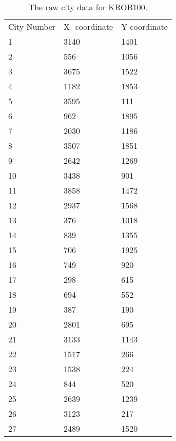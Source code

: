 \begin{longtable}[c]{ p{} p{} p{} } 
		\caption{The raw city data for KROB100.} \\   
	\label{longtable:KROB100Data}
	City Number & X- coordinate & Y-coordinate \\
	1           & 3140          & 1401         \\
	2           & 556           & 1056         \\
	3           & 3675          & 1522         \\
	4           & 1182          & 1853         \\
	5           & 3595          & 111          \\
	6           & 962           & 1895         \\
	7           & 2030          & 1186         \\
	8           & 3507          & 1851         \\
	9           & 2642          & 1269         \\
	10          & 3438          & 901          \\
	11          & 3858          & 1472         \\
	12          & 2937          & 1568         \\
	13          & 376           & 1018         \\
	14          & 839           & 1355         \\
	15          & 706           & 1925         \\
	16          & 749           & 920          \\
	17          & 298           & 615          \\
	18          & 694           & 552          \\
	19          & 387           & 190          \\
	20          & 2801          & 695          \\
	21          & 3133          & 1143         \\
	22          & 1517          & 266          \\
	23          & 1538          & 224          \\
	24          & 844           & 520          \\
	25          & 2639          & 1239         \\
	26          & 3123          & 217          \\
	27          & 2489          & 1520         \\

\end{longtable}
